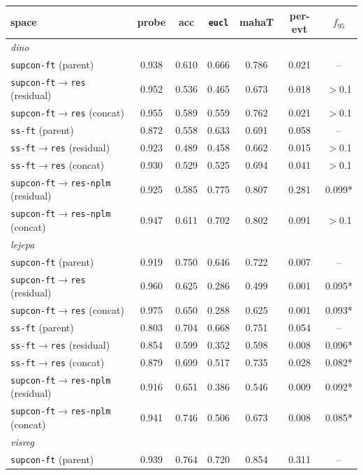 \documentclass{article}
\begin{document}
\begin{table}[p]\centering\small
\setlength{\tabcolsep}{4pt}
\begin{tabular}{lcccccc}
\toprule
space & probe & acc & \texttt{eucl} & mahaT & per-evt & $f_{95}$ \\
\midrule
\multicolumn{7}{l}{\emph{dino}}\\
\texttt{supcon-ft} (parent) & 0.938 & 0.610 & 0.666 & 0.786 & 0.021 & -- \\
\texttt{supcon-ft$\to$res} (residual) & 0.952 & 0.536 & 0.465 & 0.673 & 0.018 & $>$0.1 \\
\texttt{supcon-ft$\to$res} (concat) & 0.955 & 0.589 & 0.559 & 0.762 & 0.021 & $>$0.1 \\
\texttt{ss-ft} (parent) & 0.872 & 0.558 & 0.633 & 0.691 & 0.058 & -- \\
\texttt{ss-ft$\to$res} (residual) & 0.923 & 0.489 & 0.458 & 0.662 & 0.015 & $>$0.1 \\
\texttt{ss-ft$\to$res} (concat) & 0.930 & 0.529 & 0.525 & 0.694 & 0.041 & $>$0.1 \\
\texttt{supcon-ft$\to$res-nplm} (residual) & 0.925 & 0.585 & 0.775 & 0.807 & 0.281 & 0.099* \\
\texttt{supcon-ft$\to$res-nplm} (concat) & 0.947 & 0.611 & 0.702 & 0.802 & 0.091 & $>$0.1 \\
\multicolumn{7}{l}{\emph{lejepa}}\\
\texttt{supcon-ft} (parent) & 0.919 & 0.750 & 0.646 & 0.722 & 0.007 & -- \\
\texttt{supcon-ft$\to$res} (residual) & 0.960 & 0.625 & 0.286 & 0.499 & 0.001 & 0.095* \\
\texttt{supcon-ft$\to$res} (concat) & 0.975 & 0.650 & 0.288 & 0.625 & 0.001 & 0.093* \\
\texttt{ss-ft} (parent) & 0.803 & 0.704 & 0.668 & 0.751 & 0.054 & -- \\
\texttt{ss-ft$\to$res} (residual) & 0.854 & 0.599 & 0.352 & 0.598 & 0.008 & 0.096* \\
\texttt{ss-ft$\to$res} (concat) & 0.879 & 0.699 & 0.517 & 0.735 & 0.028 & 0.082* \\
\texttt{supcon-ft$\to$res-nplm} (residual) & 0.916 & 0.651 & 0.386 & 0.546 & 0.009 & 0.092* \\
\texttt{supcon-ft$\to$res-nplm} (concat) & 0.941 & 0.746 & 0.506 & 0.673 & 0.008 & 0.085* \\
\multicolumn{7}{l}{\emph{visreg}}\\
\texttt{supcon-ft} (parent) & 0.939 & 0.764 & 0.720 & 0.854 & 0.311 & -- \\

\end{tabular}
\end{table}
\end{document}
